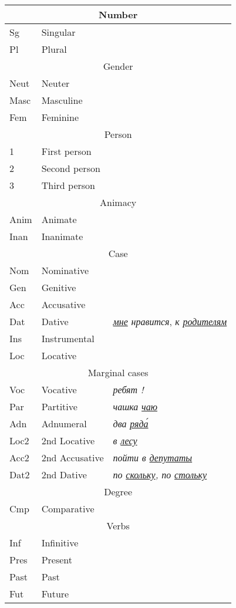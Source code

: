 \documentclass[a4paper,11pt, onecolumn,twoside]{article}
\begin{document}
\begin{tabular}{lll}
\multicolumn{3}{c}{Number} \\
\hline
Sg  & Singular & ~ \\
Pl  & Plural & ~ \\
\multicolumn{3}{c}{Gender} \\
\hline
Neut & Neuter & ~ \\
Masc & Masculine & ~ \\
Fem & Feminine& ~ \\
\multicolumn{3}{c}{Person} \\
\hline
1 & First person & ~ \\
2 & Second person & ~ \\
3 & Third person & ~ \\
\multicolumn{3}{c}{Animacy} \\
\hline
Anim & Animate & ~ \\
Inan & Inanimate & ~ \\
\multicolumn{3}{c}{Case} \\
\hline
Nom & Nominative &  \\
Gen & Genitive & ~ \\
Acc & Accusative &  \\
Dat & Dative & \emph{\underline{мне} нравится}, \emph{к \underline{родителям}} \\
Ins & Instrumental & ~ \\
Loc & Locative & ~ \\
\multicolumn{3}{c}{Marginal cases} \\
\hline
Voc & Vocative & \emph{ребят !} \\
Par & Partitive & \emph{чашка \underline{чаю}} \\
Adn & Adnumeral & \emph{два \underline{ряда́}} \\
Loc2 & 2nd Locative & \emph{в \underline{лесу}} \\
Acc2 & 2nd Accusative & \emph{пойти в \underline{депутаты}} \\
Dat2 & 2nd Dative & \emph{по \underline{скольку}, по \underline{стольку}} \\
\multicolumn{3}{c}{Degree} \\
\hline
Cmp & Comparative & ~ \\
\multicolumn{3}{c}{Verbs} \\
\hline
Inf & Infinitive & ~ \\
Pres & Present   & ~ \\
Past & Past & ~ \\
Fut & Future    & ~ \\

\end{tabular}
\end{document}
